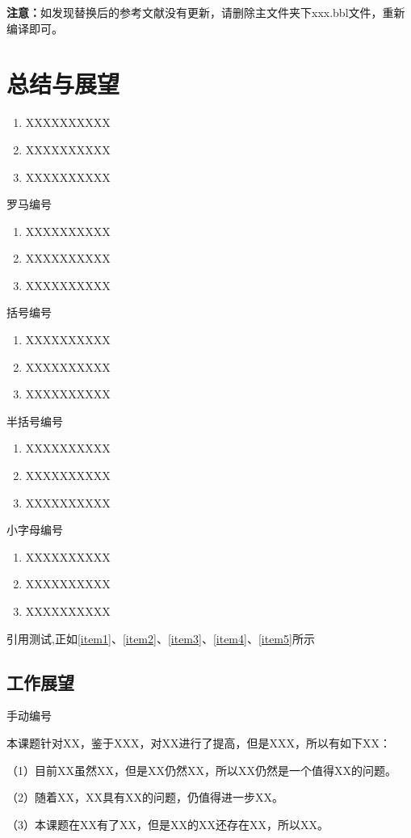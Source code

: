 \textbf{注意：}如发现替换后的参考文献没有更新，请删除主文件夹下xxx.bbl文件，重新编译即可。

\clearpage


\section{总结与展望}

\begin{enumerate}
 \item XXXXXXXXXX
 \label{item1}
 \item XXXXXXXXXX
 \item XXXXXXXXXX
\end{enumerate}
罗马编号
\begin{enumerate}[label=(\roman*)]
 \item XXXXXXXXXX
 \label{item2}
 \item XXXXXXXXXX
 \item XXXXXXXXXX
\end{enumerate}
括号编号
\begin{enumerate}[label=(\arabic*)]
 \item XXXXXXXXXX
 \label{item3}
 \item XXXXXXXXXX
 \item XXXXXXXXXX
\end{enumerate}
半括号编号
\begin{enumerate}[label=\arabic*)]
 \item XXXXXXXXXX
 \label{item4}
 \item XXXXXXXXXX
 \item XXXXXXXXXX
\end{enumerate}
小字母编号
\begin{enumerate}[label=\alph*)]
 \item XXXXXXXXXX
 \label{item5}
 \item XXXXXXXXXX
 \item XXXXXXXXXX
\end{enumerate}

引用测试,正如\ref{item1}、\ref{item2}、\ref{item3}、\ref{item4}、\ref{item5}所示

\subsection{工作展望}
手动编号 %
\par
本课题针对XX，鉴于XXX，对XX进行了提高，但是XXX，所以有如下XX：

（1）目前XX虽然XX，但是XX仍然XX，所以XX仍然是一个值得XX的问题。

（2）随着XX，XX具有XX的问题，仍值得进一步XX。

（3）本课题在XX有了XX，但是XX的XX还存在XX，所以XX。


\clearpage
